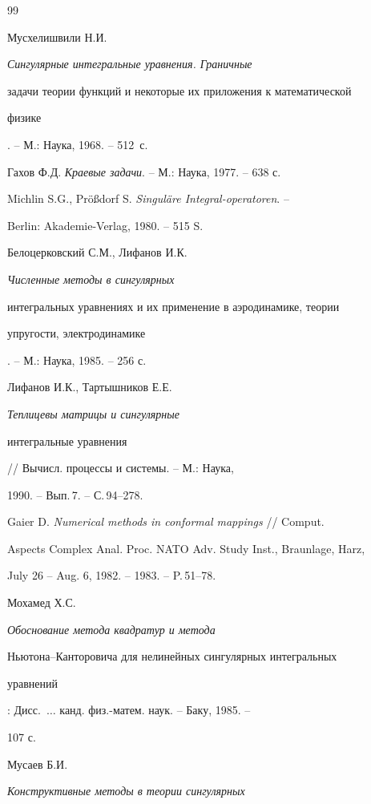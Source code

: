 \begin{thebibliography}{99}







Мусхелишвили Н.И. {\em Сингулярные интегральные уравнения. Граничные 


задачи теории функций и некоторые их приложения к математической 


физике}. -- М.: Наука, 1968. -- 512~с.




Гахов Ф.Д. {\em Краевые задачи}. -- М.: Наука, 1977. -- 638 с.




Michlin S.G., Pr\"o\ss{}dorf S. {\em Singul\"are Integral-operatoren}. -- 


Berlin: Akademie-Verlag, 1980. -- 515 S.




Белоцерковский С.М., Лифанов И.К. {\em Численные методы в сингулярных 


интегральных уравнениях и их применение в аэродинамике, теории 


упругости, электродинамике}. -- М.: Наука, 1985. -- 256 с.




Лифанов И.К., Тартышников Е.Е. {\em Теплицевы матрицы и сингулярные 


интегральные уравнения} // Вычисл. процессы и системы. -- М.: Наука, 


1990. -- Вып.\,7. -- С.\,94--278.




Gaier D. {\em Numerical methods in conformal mappings} // Comput. 


Aspects Complex Anal. Proc. NATO Adv. Study Inst., Braunlage, Harz, 


July 26 -- Aug. 6, 1982. -- 1983. -- P.\,51--78.




Мохамед Х.С. {\em Обоснование метода квадратур и метода 


Ньютона--Канторовича для нелинейных сингулярных интегральных 


уравнений}: Дисс.~$\dotsc$ канд. физ.-матем. наук. -- Баку, 1985. -- 


107 с.




Мусаев Б.И. {\em Конструктивные методы в теории сингулярных 


}
\end{thebibliography}
